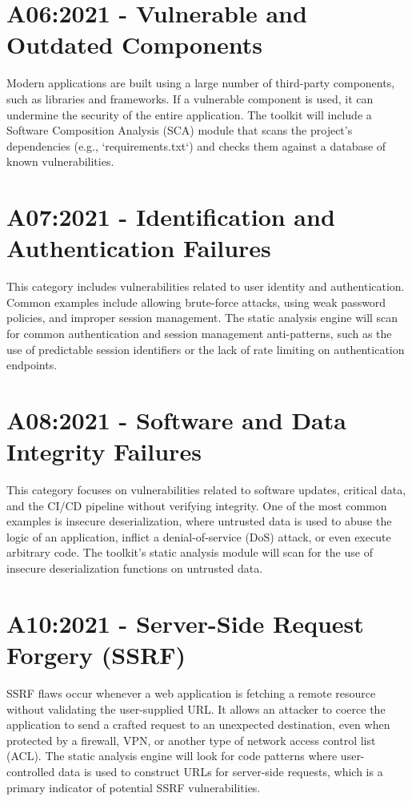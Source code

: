 \section{A06:2021 - Vulnerable and Outdated Components}
Modern applications are built using a large number of third-party components, such as libraries and frameworks. If a vulnerable component is used, it can undermine the security of the entire application.
The toolkit will include a Software Composition Analysis (SCA) module that scans the project's dependencies (e.g., `requirements.txt`) and checks them against a database of known vulnerabilities.

\section{A07:2021 - Identification and Authentication Failures}
This category includes vulnerabilities related to user identity and authentication. Common examples include allowing brute-force attacks, using weak password policies, and improper session management.
The static analysis engine will scan for common authentication and session management anti-patterns, such as the use of predictable session identifiers or the lack of rate limiting on authentication endpoints.

\section{A08:2021 - Software and Data Integrity Failures}
This category focuses on vulnerabilities related to software updates, critical data, and the CI/CD pipeline without verifying integrity. One of the most common examples is insecure deserialization, where untrusted data is used to abuse the logic of an application, inflict a denial-of-service (DoS) attack, or even execute arbitrary code.
The toolkit's static analysis module will scan for the use of insecure deserialization functions on untrusted data.

\section{A10:2021 - Server-Side Request Forgery (SSRF)}
SSRF flaws occur whenever a web application is fetching a remote resource without validating the user-supplied URL. It allows an attacker to coerce the application to send a crafted request to an unexpected destination, even when protected by a firewall, VPN, or another type of network access control list (ACL).
The static analysis engine will look for code patterns where user-controlled data is used to construct URLs for server-side requests, which is a primary indicator of potential SSRF vulnerabilities.